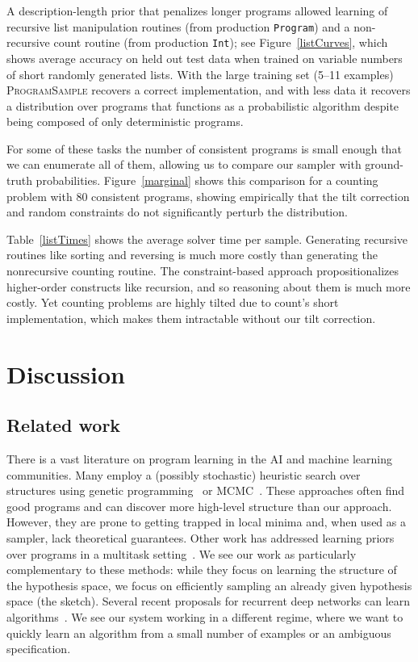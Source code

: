 \documentclass{article}
\newcommand{\theSystem}{\textsc{ProgramSample}}
\begin{document}
A description-length prior that penalizes longer programs allowed learning of recursive list manipulation routines (from production \verb|Program|) and a non-recursive count routine (from production \verb|Int|); see Figure~\ref{listCurves},
which shows average accuracy on held out test data when trained on variable numbers of short randomly generated lists.
With the large training set (5--11 examples) \theSystem{} recovers a correct implementation,
and with less data it recovers a distribution over programs
that functions as a probabilistic algorithm despite being composed of only deterministic programs.


For some of these  tasks the number of consistent programs is small enough that we can enumerate all of them, allowing us to compare our sampler with ground-truth probabilities.
Figure~\ref{marginal} shows this comparison for a counting problem with 80 consistent programs, showing empirically that the tilt correction and random constraints do not significantly perturb the distribution.

Table~\ref{listTimes} shows the average solver time per sample. Generating recursive routines like sorting and reversing is much more costly than generating the nonrecursive counting routine.
The constraint-based approach propositionalizes higher-order constructs like recursion, and so reasoning about them is much more costly.
Yet counting problems are highly tilted due to count's short implementation, which makes them intractable without our tilt correction.



\section{Discussion}

\subsection{Related work}
There is a vast literature on program learning in the AI and machine learning communities.
Many employ a (possibly stochastic) heuristic search over structures using genetic programming~\cite{DBLP:books/daglib/0070933} or MCMC~\cite{schkufza2013stochastic}.
These approaches often find good programs and can discover more high-level structure than our approach.
However, they are prone to getting trapped in local minima
and, when used as a sampler, lack theoretical guarantees.
Other work has addressed learning priors over programs in a multitask setting~\cite{DBLP:conf/icml/LiangJK10,menon2013machine}.
We see our work as particularly complementary to these methods: while they focus on learning the structure of the hypothesis space,
we focus on efficiently sampling an already given hypothesis space (the sketch).
Several recent proposals for recurrent deep networks can learn algorithms~\cite{DBLP:journals/corr/ReedF15,graves2014neural}.
We see our system working in a different regime,
where we want to quickly learn an algorithm from a small number of examples or an ambiguous specification.
\end{document}
